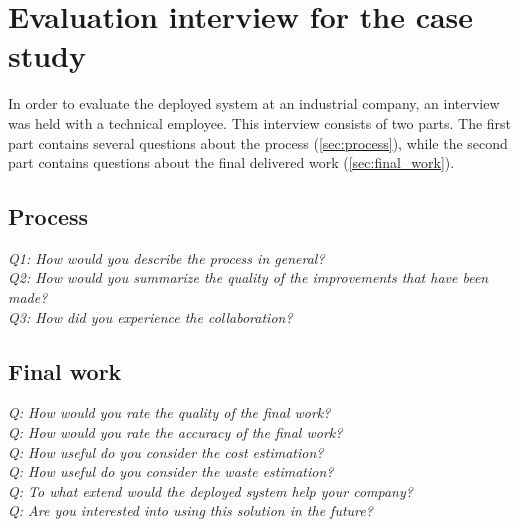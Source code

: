 \chapter{Evaluation interview for the case study} 
\label{ch:interview}
In order to evaluate the deployed system at an industrial company, an interview was held with a technical employee. This interview consists of two parts. The first part contains several questions about the process (\autoref{sec:process}), while the second part contains questions about the final delivered work (\autoref{sec:final_work}).

\section{Process} \label{sec:process}
\textit{Q1: How would you describe the process in general?}\\

\noindent
\textit{Q2: How would you summarize the quality of the improvements that have been made?}\\

\noindent
\textit{Q3: How did you experience the collaboration?}\\

\section{Final work} \label{sec:final_work}
\noindent
\textit{Q: How would you rate the quality of the final work?}\\

\noindent
\textit{Q: How would you rate the accuracy of the final work?}\\

\noindent
\textit{Q: How useful do you consider the cost estimation?}\\

\noindent
\textit{Q: How useful do you consider the waste estimation?}\\

\noindent
\textit{Q: To what extend would the deployed system help your company?}\\

\noindent
\textit{Q: Are you interested into using this solution in the future?}\\	